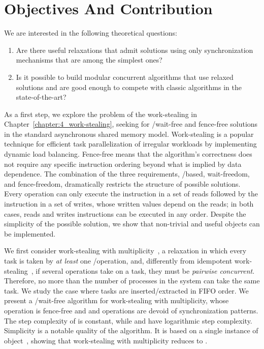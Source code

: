 \section{\label{section:Objectives}Objectives And Contribution}

We are interested in the following theoretical questions:

\begin{enumerate}
  \item Are there useful relaxations that admit solutions using only synchronization mechanisms that are among the simplest ones?
  \item Is it possible to build modular concurrent algorithms that use relaxed solutions and are good enough to compete with classic algorithms in the state-of-the-art?
\end{enumerate}

As a first step, we explore the problem of the work-stealing in Chapter~\ref{chapter:4_work-stealing}, seeking for \R/\W wait-free and fence-free solutions in the standard asynchronous shared memory model. Work-stealing is a popular technique for efficient task parallelization of irregular workloads by implementing dynamic load balancing. Fence-free means that the algorithm's correctness does not require any specific instruction ordering beyond what is implied by data dependence. The combination of the three requirements, \R/\W based, wait-freedom, and fence-freedom, dramatically restricts the structure of possible solutions. Every operation can only execute the \R instruction in a set of reads followed by the \W instruction in a set of writes, whose written values depend on the reads; in both cases, reads and writes instructions can be executed in any order. Despite the simplicity of the possible solution, we show that non-trivial and useful objects can be implemented.

We first consider work-stealing with multiplicity~\cite{DBLP_journals_dc_CastanedaRR23}, a relaxation in which every task is taken by \textit{at least} one \Take/\Steal operation, and, differently from idempotent work-stealing~\cite{maged.vechev.2009}, if several operations take on a task, they must be \textit{pairwise concurrent}. Therefore, no more than the number of processes in the system can take the same task. We study the case where tasks are inserted/extracted in FIFO order. We present a \R/\W wait-free algorithm for work-stealing with multiplicity, whose \Put operation is fence-free and \Take and \Steal operations are devoid of \RAW synchronization patterns. The step complexity of \Put is constant, while \Take and \Steal have logarithmic step complexity. Simplicity is a notable quality of the algorithm. It is based on a single instance of \MaxReg object~\cite{DBLP_journals_jacm_AspnesAC12,DBLP_journals_siamcomp_JayantiTT00}, showing that work-stealing with multiplicity reduces to \MaxReg.

